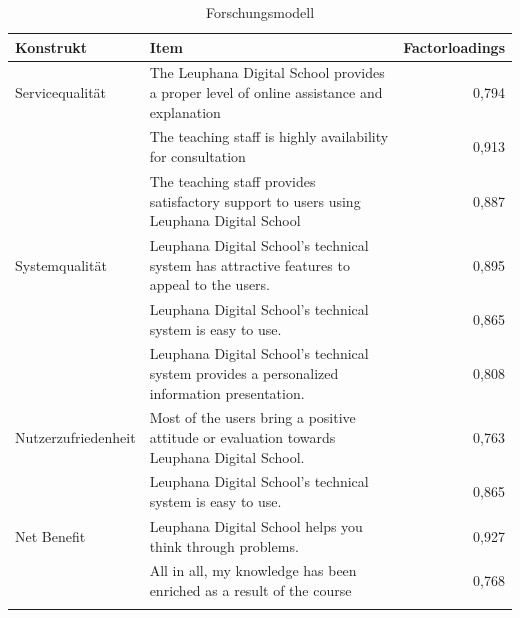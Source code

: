 \begin{table}[ht] 
\footnotesize
\caption{Forschungsmodell}
\label{tab:Forschungsmodell} 
\begin{tabular}{@{}lp{10cm}r@{}} \toprule

\textbf{Konstrukt} & \textbf{Item} & \textbf{Factorloadings} \\ \midrule

Servicequalität & The Leuphana Digital School provides a proper level of online assistance and explanation & 0,794\\ 
& The teaching staff is highly availability for consultation & 0,913 \\
& The teaching staff provides satisfactory support to users using Leuphana Digital School & 0,887 \\ 
Systemqualität & Leuphana Digital School’s technical system has attractive features to appeal to the users. & 0,895\\ 
& Leuphana Digital School’s technical system is easy to use. & 0,865 \\
& Leuphana Digital School’s technical system provides a personalized information presentation. & 0,808 \\ 
Nutzerzufriedenheit & Most of the users bring a positive attitude or evaluation towards Leuphana Digital School. & 0,763\\ 
& Leuphana Digital School’s technical system is easy to use. & 0,865 \\ 
Net Benefit & Leuphana Digital School helps you think through problems.  & 0,927\\ 
& All in all, my knowledge has been enriched as a result of the course & 0,768 \\ \addlinespace 
  \bottomrule

\end{tabular}	
\end{table}




